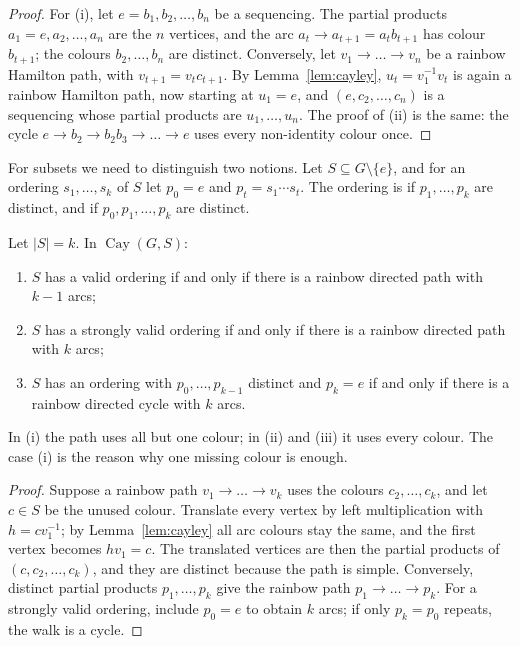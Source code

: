 \begin{proof}
For (i), let $e=b_1,b_2,\dots,b_n$ be a sequencing. The partial products $a_1=e,a_2,\dots,a_n$ are the $n$ vertices, and the arc $a_t\to a_{t+1}=a_tb_{t+1}$ has colour $b_{t+1}$; the colours $b_2,\dots,b_n$ are distinct. Conversely, let $v_1\to\dots\to v_n$ be a rainbow Hamilton path, with $v_{t+1}=v_tc_{t+1}$. By Lemma~\ref{lem:cayley}, $u_t=v_1^{-1}v_t$ is again a rainbow Hamilton path, now starting at $u_1=e$, and $(e,c_2,\dots,c_n)$ is a sequencing whose partial products are $u_1,\dots,u_n$. The proof of (ii) is the same: the cycle $e\to b_2\to b_2b_3\to\dots\to e$ uses every non-identity colour once.
\end{proof}

For subsets we need to distinguish two notions. Let $S\subseteq G\setminus\{e\}$, and for an ordering $s_1,\dots,s_k$ of $S$ let $p_0=e$ and $p_t=s_1\cdots s_t$. The ordering is  if $p_1,\dots,p_k$ are distinct, and  if $p_0,p_1,\dots,p_k$ are distinct.

\begin{proposition}\label{prop:subsets}
Let $|S|=k$. In $\operatorname{Cay}(G,S)$:
\begin{enumerate}
\item $S$ has a valid ordering if and only if there is a rainbow directed path with $k-1$ arcs;
\item $S$ has a strongly valid ordering if and only if there is a rainbow directed path with $k$ arcs;
\item $S$ has an ordering with $p_0,\dots,p_{k-1}$ distinct and $p_k=e$ if and only if there is a rainbow directed cycle with $k$ arcs.
\end{enumerate}
\end{proposition}

In (i) the path uses all but one colour; in (ii) and (iii) it uses every colour. The case (i) is the reason why one missing colour is enough.

\begin{proof}
Suppose a rainbow path $v_1\to\dots\to v_k$ uses the colours $c_2,\dots,c_k$, and let $c\in S$ be the unused colour. Translate every vertex by left multiplication with $h=cv_1^{-1}$; by Lemma~\ref{lem:cayley} all arc colours stay the same, and the first vertex becomes $hv_1=c$. The translated vertices are then the partial products of $(c,c_2,\dots,c_k)$, and they are distinct because the path is simple. Conversely, distinct partial products $p_1,\dots,p_k$ give the rainbow path $p_1\to\dots\to p_k$. For a strongly valid ordering, include $p_0=e$ to obtain $k$ arcs; if only $p_k=p_0$ repeats, the walk is a cycle.
\end{proof}

